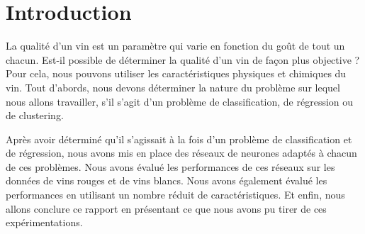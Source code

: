 \chapter{Introduction}
\label{chap:intro}

La qualité d'un vin est un paramètre qui varie en fonction du goût de tout un chacun. Est-il possible de déterminer la qualité
d'un vin de façon plus objective ? Pour cela, nous pouvons utiliser les caractéristiques physiques et chimiques du vin.
Tout d'abords, nous devons déterminer la nature du problème sur lequel nous allons travailler, s'il s'agit d'un problème de
classification, de régression ou de clustering.

Après avoir déterminé qu'il s'agissait à la fois d'un problème de classification et de régression, nous avons mis en place des
réseaux de neurones adaptés à chacun de ces problèmes. Nous avons évalué les performances de ces réseaux sur les données de vins
rouges et de vins blancs. Nous avons également évalué les performances en utilisant un nombre réduit de caractéristiques. Et enfin,
nous allons conclure ce rapport en présentant ce que nous avons pu tirer de ces expérimentations.